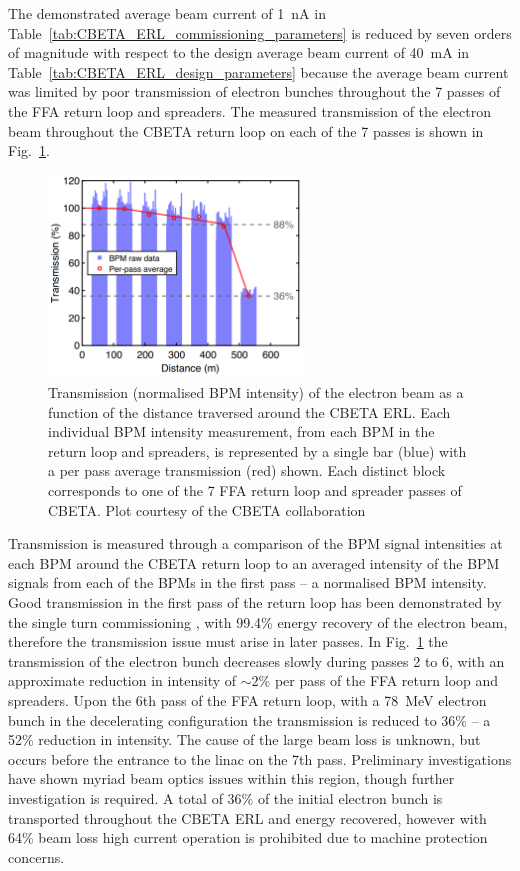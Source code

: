 \documentclass[../main.tex]{subfiles}
\begin{document}
The demonstrated average beam current of 1~\si{\nano\ampere} in Table~\ref{tab:CBETA_ERL_commissioning_parameters} is reduced by seven orders of magnitude with respect to the design average beam current of 40~\si{\milli\ampere} in Table~\ref{tab:CBETA_ERL_design_parameters} because the average beam current was limited by poor transmission of electron bunches throughout the 7 passes of the FFA return loop and spreaders. The measured transmission of the electron beam throughout the CBETA return loop on each of the 7 passes is shown in Fig.~\ref{fig:CBETA_transmission}.
\begin{figure}[!h]
\centering
\includegraphics[width=0.6\textwidth]{Figures/CBETA_Multi-Pass_Commissioning/transmission.pdf}
\caption{Transmission (normalised BPM intensity) of the electron beam as a function of the distance traversed around the CBETA ERL.  Each individual BPM intensity measurement, from each BPM in the return loop and spreaders, is represented by a single bar (blue) with a per pass average transmission (red) shown. Each distinct block corresponds to one of the 7 FFA return loop and spreader passes of CBETA. Plot courtesy of the CBETA collaboration}
\label{fig:CBETA_transmission}
\end{figure}

Transmission is measured through a comparison of the BPM signal intensities at each BPM around the CBETA return loop to an averaged intensity of the BPM signals from each of the BPMs in the first pass -- a normalised BPM intensity. Good transmission in the first pass of the return loop has been demonstrated by the single turn commissioning \cite{gulliford2021measurement}, with 99.4\% energy recovery of the electron beam, therefore the transmission issue must arise in later passes. In Fig.~\ref{fig:CBETA_transmission} the transmission of the electron bunch decreases slowly during passes 2 to 6, with an approximate reduction in intensity of $\sim 2$\% per pass of the FFA return loop and spreaders. Upon the 6th pass of the FFA return loop, with a 78~\si{\mega\electronvolt} electron bunch in the decelerating configuration the transmission is reduced to 36\% -- a 52\% reduction in intensity. The cause of the large beam loss is unknown, but occurs before the entrance to the linac on the 7th pass. Preliminary investigations have shown myriad beam optics issues within this region, though further investigation is required. A total of 36\% of the initial electron bunch is transported throughout the CBETA ERL and energy recovered, however with 64\% beam loss high current operation is prohibited due to machine protection concerns.
\end{document}
